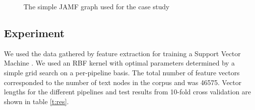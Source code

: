 \begin{figure}[h]
\centering
{}
\label{f:jamfgraph}
\caption{The simple JAMF graph used for the case study}
\end{figure}

\subsection{Experiment}

We used the data gathered by feature extraction for training a Support Vector Machine \cite{libsvm}.
We used an RBF kernel with optimal parameters determined by a simple grid search on a per-pipeline basis.
The total number of feature vectors corresponded to the number of text nodes in the corpus and was 46575.
Vector lengths for the different pipelines and test results from 10-fold cross validation are shown in table \ref{t:res}.

